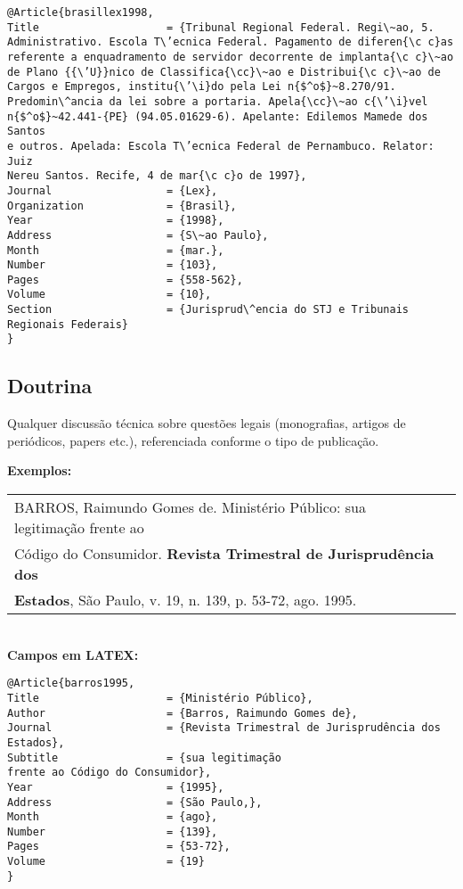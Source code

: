 \begingroup
\fontsize{10pt}{12pt}\selectfont
\begin{verbatim}
@Article{brasillex1998,
Title                    = {Tribunal Regional Federal. Regi\~ao, 5. 
Administrativo. Escola T\’ecnica Federal. Pagamento de diferen{\c c}as 
referente a enquadramento de servidor decorrente de implanta{\c c}\~ao 
de Plano {{\’U}}nico de Classifica{\cc}\~ao e Distribui{\c c}\~ao de 
Cargos e Empregos, institu{\’\i}do pela Lei n{$^o$}~8.270/91. 
Predomin\^ancia da lei sobre a portaria. Apela{\cc}\~ao c{\’\i}vel
n{$^o$}~42.441-{PE} (94.05.01629-6). Apelante: Edilemos Mamede dos Santos
e outros. Apelada: Escola T\’ecnica Federal de Pernambuco. Relator: Juiz
Nereu Santos. Recife, 4 de mar{\c c}o de 1997},
Journal                  = {Lex},
Organization             = {Brasil},
Year                     = {1998},
Address                  = {S\~ao Paulo},
Month                    = {mar.},
Number                   = {103},
Pages                    = {558-562},
Volume                   = {10},
Section                  = {Jurisprud\^encia do STJ e Tribunais Regionais Federais}
}
\end{verbatim}
\endgroup
\subsection{Doutrina}
	
Qualquer discussão técnica sobre questões legais (monografias, artigos
de periódicos, papers etc.), referenciada conforme o tipo de publicação. 
	
\textbf{Exemplos:} \\
	
\begin{tabular}{|l|c|} \hline
	BARROS, Raimundo Gomes de. Ministério Público: sua legitimação	frente ao \\
	Código do Consumidor. \textbf{Revista Trimestral de Jurisprudência dos}    \\
	\textbf{Estados}, São Paulo, v. 19, n. 139, p. 53-72, ago. 1995.            \\\hline
\end{tabular} \\
	
\textbf{Campos em LATEX:} 
	
\begingroup
\fontsize{10pt}{12pt}\selectfont
\begin{verbatim}
@Article{barros1995,
Title                    = {Ministério Público},
Author                   = {Barros, Raimundo Gomes de},
Journal                  = {Revista Trimestral de Jurisprudência dos 
Estados},
Subtitle                 = {sua legitimação
frente ao Código do Consumidor},
Year                     = {1995},
Address                  = {São Paulo,},
Month                    = {ago},
Number                   = {139},
Pages                    = {53-72},
Volume                   = {19}
}
\end{verbatim}
\endgroup
